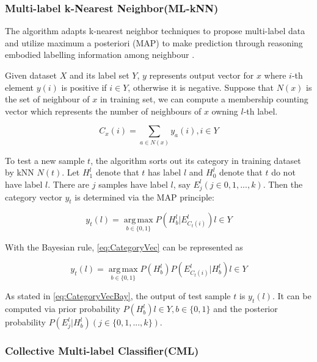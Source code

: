 \subsubsection{Multi-label k-Nearest Neighbor(ML-kNN)}

The algorithm adapts k-nearest neighbor techniques to propose multi-label data and utilize maximum a posteriori (MAP) to make prediction through reasoning embodied labelling information among neighbour \citep{zhang2007ml}.

Given dataset $X$ and its label set $Y$, $y$ represents output vector for $x$ where $i$-th element $y(i)$ is positive if $i \in Y$, otherwise it is negative. Suppose that $N(x)$ is the set of neighbour of $x$ in training set, we can compute a membership counting vector which represents the number of neighbours of $x$ owning $l$-th label.

\begin{equation}\label{eq:KNNCounting}
C_{x}(i) = \sum_{a \in N(x)} y_{a}(i), i \in Y
\end{equation}

To test a new sample $t$, the algorithm sorts out its category in training dataset by kNN $N(t)$. Let $H_{1}^l$ denote that $t$ has label $l$ and $H_{0}^l$ denote that $t$ do not have label $l$. There are $j$ samples have label $l$, say $E_{j}^l (j \in {0,1,...,k})$. Then the category vector $y_{t}$ is determined via the MAP principle:

\begin{equation}\label{eq:CategoryVec}
y_{t}(l) = \operatorname*{arg\,max}_{b \in \{0,1\}} P(H_{b}^l|E_{C_{t}(i) }^l) l \in Y
\end{equation}

With the Bayesian rule, \ref{eq:CategoryVec} can be represented as

\begin{equation}\label{eq:CategoryVecBay}
y_{t}(l) = \operatorname*{arg\,max}_{b \in \{0,1\}} P(H_{b}^l)P(E_{C_{t}(i) }^l|H_{b}^l) l \in Y
\end{equation}

As stated in \ref{eq:CategoryVecBay}, the output of test sample $t$ is $y_{t}(l)$. It can be computed via prior probability $P(H_{b}^l) l \in Y, b \in \{0,1\}$ and the posterior probability $P(E_{j}^l|H_{b}^l) (j \in \{0,1,...,k\})$.

\subsubsection{Collective Multi-label Classifier(CML)}

